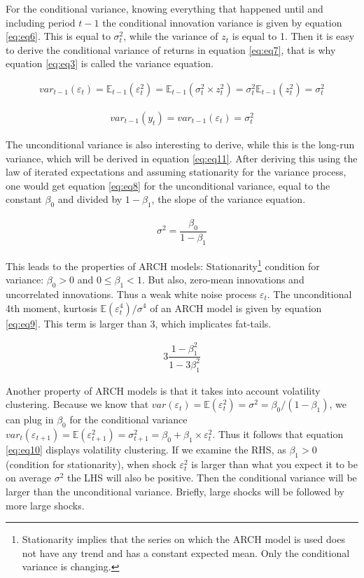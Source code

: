 \documentclass[a4paper, nobind]{templates/ociamthesis}
\begin{document}
\noindent For the conditional variance, knowing everything that happened until and including period \(t-1\) the conditional innovation variance is given by equation \eqref{eq:eq6}. This is equal to \(\sigma_t^2\), while the variance of \(z_t\) is equal to 1. Then it is easy to derive the conditional variance of returns in equation \eqref{eq:eq7}, that is why equation \eqref{eq:eq3} is called the variance equation.

\begin{align} 
var_{t-1}(\varepsilon_t) = \mathbb{E}_{t-1}(\varepsilon_{t}^2) = \mathbb{E}_{t-1}(\sigma_t^2 \times z_t^2) = \sigma_t^2\mathbb{E}_{t-1}(z_t^2) = \sigma_t^2
 \label{eq:eq6}
\end{align} 

\begin{align} 
var_{t-1}(y_t) = var_{t-1}(\varepsilon_t)= \sigma_t^2
 \label{eq:eq7}
\end{align}

\noindent The unconditional variance is also interesting to derive, while this is the long-run variance, which will be derived in equation \eqref{eq:eq11}. After deriving this using the law of iterated expectations and assuming stationarity for the variance process, one would get equation \eqref{eq:eq8} for the unconditional variance, equal to the constant \(\beta_0\) and divided by \(1-\beta_1\), the slope of the variance equation.

\begin{align} 
\sigma^2 = \dfrac{\beta_0}{1-\beta_1}
 \label{eq:eq8}
\end{align}

\noindent This leads to the properties of ARCH models: Stationarity\footnote{Stationarity implies that the series on which the ARCH model is used does not have any trend and has a constant expected mean. Only the conditional variance is changing.} condition for variance: \(\beta_0>0\) and \(0 \le \beta_1 < 1\). But also, zero-mean innovations and uncorrelated innovations. Thus a weak white noise process \(\varepsilon_t\). The unconditional 4th moment, kurtosis \(\mathbb{E}(\varepsilon_t^4)/\sigma^4\) of an ARCH model is given by equation \eqref{eq:eq9}. This term is larger than 3, which implicates fat-tails.

\begin{align} 
3\dfrac{1-\beta_1^2}{1-3\beta_1^2}
 \label{eq:eq9}
\end{align}

\noindent Another property of ARCH models is that it takes into account volatility clustering. Because we know that \(var(\varepsilon_t) = \mathbb{E}(\varepsilon_t^2) = \sigma^2 = \beta_0/(1-\beta_1)\), we can plug in \(\beta_0\) for the conditional variance \(var_t(\varepsilon_{t+1}) = \mathbb{E}(\varepsilon_{t+1}^2) = \sigma_{t+1}^2 = \beta_0 + \beta_1\times\varepsilon_t^2\). Thus it follows that equation \eqref{eq:eq10} displays volatility clustering. If we examine the RHS, as \(\beta_1>0\) (condition for stationarity), when shock \(\varepsilon_t^2\) is larger than what you expect it to be on average \(\sigma^2\) the LHS will also be positive. Then the conditional variance will be larger than the unconditional variance. Briefly, large shocks will be followed by more large shocks.
\end{document}
